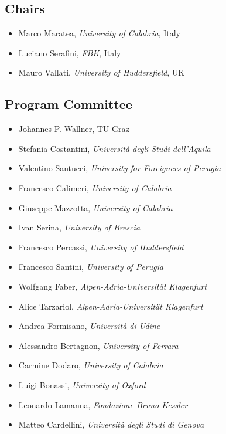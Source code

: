 \documentclass[
]{ceurart}
\begin{document}
\maketitle


\subsection*{Chairs}
\begin{itemize}
  \item Marco Maratea, \emph{University of Calabria}, Italy
  \item Luciano Serafini, \emph{FBK}, Italy
  \item Mauro Vallati, \emph{University of Huddersfield}, UK
\end{itemize}


\subsection*{Program Committee}
\begin{itemize}
  \item Johannes P. Wallner, TU Graz
  \item Stefania Costantini, \emph{Università degli Studi dell'Aquila}
  \item Valentino Santucci, \emph{University for Foreigners of Perugia}
  \item Francesco Calimeri, \emph{University of Calabria}
  \item Giuseppe Mazzotta, \emph{University of Calabria}
  \item Ivan Serina, \emph{University of Brescia}
  \item Francesco Percassi, \emph{University of Huddersfield}
  \item Francesco Santini, \emph{University of Perugia}
  \item Wolfgang Faber, \emph{Alpen-Adria-Universität Klagenfurt}
  \item Alice Tarzariol, \emph{Alpen-Adria-Universität Klagenfurt}
  \item Andrea Formisano, \emph{Università di Udine}
  \item Alessandro Bertagnon, \emph{University of Ferrara}
  \item Carmine Dodaro, \emph{University of Calabria}
  \item Luigi Bonassi, \emph{University of Oxford}
  \item Leonardo Lamanna, \emph{Fondazione Bruno Kessler}
  \item Matteo Cardellini, \emph{Università degli Studi di Genova}
\end{itemize}
\end{document}
